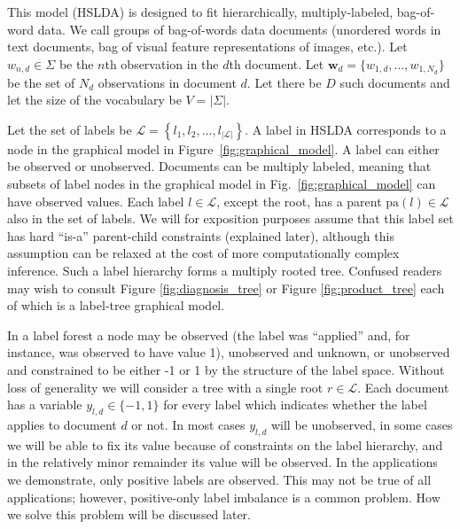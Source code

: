 
\label{sec:model} 

This model (HSLDA) is designed to fit hierarchically, multiply-labeled, bag-of-word data.  We
call groups of bag-of-words data documents (unordered words in text documents, bag of visual feature representations of images, etc.).  Let $w_{n,d}
\in \Sigma$ be the $n$th observation in the $d$th document.  Let $\mathbf{w}_d
= \{w_{1,d},\ldots,w_{1,N_d}\}$ be the  set of $N_d$ observations in document
$d$.  Let there be $D$ such documents and let the size of the vocabulary be
$V=|\Sigma|$.  

Let the set of labels be $\mathcal{L}=\left\{
  l_{1},l_{2},\ldots,l_{\left|\mathcal{L}\right|}\right\} $.  A label in HSLDA corresponds to a node in the graphical model in Figure~\ref{fig:graphical_model}.  A label can either be observed or unobserved.  Documents can be multiply labeled, meaning that subsets of label nodes in the graphical model in Fig.~\ref{fig:graphical_model} can have observed values.  Each label
$l \in \mathcal{L}$, except the root, has a parent $\mathrm{pa}(l) \in \mathcal{L}$
also in the set of labels. 
 We will for exposition purposes assume that this label set has hard ``is-a''
 parent-child constraints (explained later), although this assumption can be
 relaxed at the cost of more computationally complex inference.  Such a label hierarchy forms a multiply rooted tree.   Confused readers may wish to consult Figure \ref{fig:diagnosis_tree} or Figure \ref{fig:product_tree} each of which is a  label-tree graphical model.  
 
 In a label forest a node may be observed (the label was ``applied'' and, for instance, was observed to have value 1), unobserved and unknown, or unobserved and constrained to be either -1 or 1 by the structure of the label space.   Without loss of generality we will consider a tree with a single root $r\in\mathcal{L}$.  Each document has a variable $y_{l,d} \in \{-1,1\}$ for every label which indicates whether the label applies to document $d$ or not.   In most cases $y_{l,d}$ will be unobserved, in some cases we will be able to fix its value because of  constraints on the label hierarchy, and in the relatively minor remainder its value will be observed.  In the applications we demonstrate, only positive labels are observed.   This may not be true of all applications; however, positive-only label imbalance is a common problem.  How we solve this problem will be discussed later.
 
